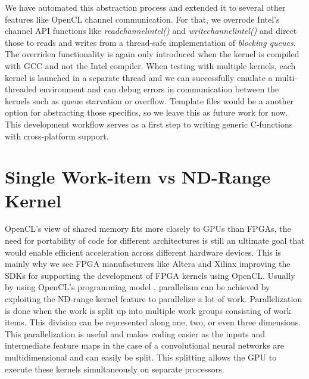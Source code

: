  \label{code:abstraction} 
  
We have automated this abstraction process and extended it to several other features like OpenCL channel communication. For that, we overrode Intel's channel API \cite{intel2016sdk} functions like \emph{read\textunderscore channel\textunderscore intel()} and \emph{write\textunderscore channel\textunderscore intel()} and direct those to reads and writes from a thread-safe implementation of \emph{blocking queues}. The overriden functionality is again only introduced when the kernel is compiled with GCC and not the Intel compiler. When testing with multiple kernels, each kernel is launched in a separate thread and we can successfully emulate a multi-threaded environment and can debug errors in communication between the kernels such as queue starvation or overflow. 
Template files would be a another option for abstracting those specifics, so we leave this as future work for now. This development workflow serves as a first step to writing generic C-functions with cross-platform support.

\section{Single Work-item vs ND-Range Kernel}

OpenCL’s view of shared memory fits more closely to GPUs than FPGAs, the need for portability of code for different architectures is still an ultimate goal that would enable efficient acceleration across different hardware devices. This is mainly why we see FPGA manufacturers like Altera and Xilinx improving the SDKs for supporting the development of FPGA kernels using OpenCL. Usually by using OpenCL’s programming model \cite{opencl}, parallelism can be achieved by exploiting the ND-range kernel feature to parallelize a lot of work. Parallelization is done when the work is split up into multiple work groups consisting of work items. This division can be represented along one, two, or even three dimensions. This parallelization is useful and makes coding easier as the inputs and intermediate feature maps in the case of a convolutional neural networks are multidimensional and can easily be split. This splitting allows the GPU to execute these kernels simultaneously on separate processors. 

